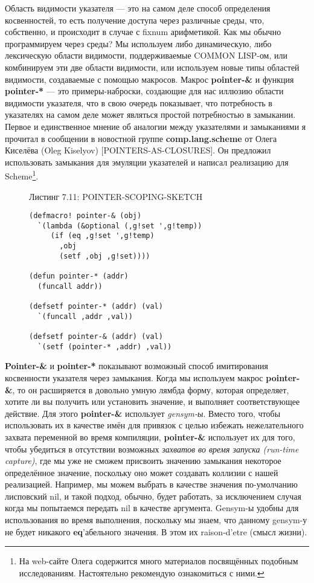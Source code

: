 Область видимости указателя --- это на самом деле способ определения косвенностей, то есть получение доступа через различные среды, что, собственно, и происходит в случае с fixnum арифметикой. Как мы обычно программируем через среды? Мы используем либо динамическую, либо лексическую области видимости, поддерживаемые COMMON LISP-ом, или комбинируем эти две области видимости, или используем новые типы областей видимости, создаваемые с помощью макросов. Макрос \textbf{pointer-\&} и функция \textbf{pointer-*} --- это примеры-наброски, создающие для нас иллюзию области видимости указателя, что в свою очередь показывает, что потребность в указателях на самом деле может являться простой потребностью в замыкании. Первое и единственное мнение об аналогии между указателями и замыканиями я прочитал в сообщении в новостной группе \textbf{comp.lang.scheme} от Олега Киселёва (Oleg Kiselyov) [POINTERS-AS-CLOSURES]. Он предложил использовать замыкания для эмуляции указателей и написал реализацию для Scheme\footnote{На web-сайте Олега содержится много материалов посвящённых подобным исследованиям. Настоятельно рекомендую ознакомиться с ними.}.

\begin{figure}Листинг 7.11: POINTER-SCOPING-SKETCH\label{listing_7.11}
\listbegin
\begin{verbatim}
(defmacro! pointer-& (obj)
  `(lambda (&optional (,g!set ',g!temp))
     (if (eq ,g!set ',g!temp)
       ,obj
       (setf ,obj ,g!set))))

(defun pointer-* (addr)
  (funcall addr))

(defsetf pointer-* (addr) (val)
  `(funcall ,addr ,val))

(defsetf pointer-& (addr) (val)
  `(setf (pointer-* ,addr) ,val))
\end{verbatim}
\listend
\end{figure}

\textbf{Pointer-\&} и \textbf{pointer-*} показывают возможный способ имитирования косвенности указателя через замыкания. Когда мы используем макрос \textbf{pointer-\&}, то он расширяется в довольно умную лямбда форму, которая определяет, хотите ли вы получить или установить значение, и выполняет соответствующее действие. Для этого \textbf{pointer-\&} использует \emph{gensym-ы}. Вместо того, чтобы использовать их в качестве имён для привязок с целью избежать нежелательного захвата переменной во время компиляции, \textbf{pointer-\&} использует их для того, чтобы убедиться в отсутствии возможных \emph{захватов во время запуска (run-time capture)}, где мы уже не сможем присвоить значению замыкания некоторое определённое значение, поскольку оно может создавать коллизии с нашей реализацией. Например, мы можем выбрать в качестве значения по-умолчанию лисповский nil, и такой подход, обычно, будет работать, за исключением случая когда мы попытаемся передать nil в качестве аргумента. Gensym-ы удобны для использования во время выполнения, поскольку мы знаем, что данному gensym-у не будет никакого \textbf{eq}'абельного значения. В этом их raison-d’etre (смысл жизни).

